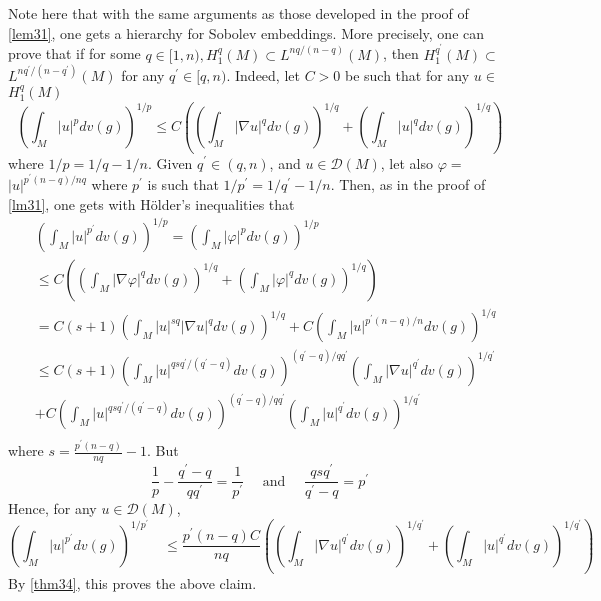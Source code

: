 \documentclass[12pt,hyperref,a4paper,UTF8]{ctexart}
\begin{document}
\vskip 3pt
Note here that with the same arguments as those developed in the proof of \autoref{lem31}, one gets a hierarchy for Sobolev embeddings. More precisely, one can prove that if for some $q \in[1, n), H_1^q(M) \subset L^{n q /(n-q)}(M)$, then $H_1^{q^{\prime}}(M) \subset$ $L^{n q^{\prime} /\left(n-q^{\prime}\right)}(M)$ for any $q^{\prime} \in[q, n)$. Indeed, let $C>0$ be such that for any $u \in$ $H_1^q(M)$
$$
\left(\int_M|u|^p d v(g)\right)^{1 / p} \leq C\left(\left(\int_M|\nabla u|^q d v(g)\right)^{1 / q}+\left(\int_M|u|^q d v(g)\right)^{1 / q}\right)
$$
where $1 / p=1 / q-1 / n$. Given $q^{\prime} \in(q, n)$, and $u \in \mathcal{D}(M)$, let also $\varphi=$ $|u|^{p^{\prime}(n-q) / n q}$ where $p^{\prime}$ is such that $1 / p^{\prime}=1 / q^{\prime}-1 / n$. Then, as in the proof of \autoref{lm31}, one gets with Hölder's inequalities that
$$
\begin{aligned}
    &\left(\int_M|u|^{p^{\prime}} d v(g)\right)^{1 / p} =\left(\int_M|\varphi|^p d v(g)\right)^{1 / p} \\
    &\leq C\left(\left(\int_M|\nabla \varphi|^q d v(g)\right)^{1 / q}+\left(\int_M|\varphi|^q d v(g)\right)^{1 / q}\right) \\
    &=C(s+1)\left(\int_M|u|^{s q}|\nabla u|^q d v(g)\right)^{1 / q}+C\left(\int_M|u|^{p^{\prime}(n-q) / n} d v(g)\right)^{1 / q} \\
    & \leq C(s+1)\left(\int_M|u|^{q s q^{\prime} /\left(q^{\prime}-q\right)} d v(g)\right)^{\left(q^{\prime}-q\right) / q q^{\prime}}\left(\int_M|\nabla u|^{q^{\prime}} d v(g)\right)^{1 / q^{\prime}} \\
    &+C\left(\int_M|u|^{q s q^{\prime} /\left(q^{\prime}-q\right)} d v(g)\right)^{\left(q^{\prime}-q\right) / q q^{\prime}}\left(\int_M|u|^{q^{\prime}} d v(g)\right)^{1 / q^{\prime}}\\
\end{aligned}
$$
where $s=\frac{p^{\prime}(n-q)}{n q}-1$. But
$$
\frac{1}{p}-\frac{q^{\prime}-q}{q q^{\prime}}=\frac{1}{p^{\prime}} \quad \text { and } \quad \frac{q s q^{\prime}}{q^{\prime}-q}=p^{\prime}
$$
Hence, for any $u \in \mathcal{D}(M)$,
$$
\left(\int_M|u|^{p^{\prime}} d v(g)\right)^{1 / p^{\prime}} 
\quad \leq \frac{p^{\prime}(n-q) C}{n q}\left(\left(\int_M|\nabla u|^{q^{\prime}} d v(g)\right)^{1 / q^{\prime}}+\left(\int_M|u|^{q^{\prime}} d v(g)\right)^{1 / q^{\prime}}\right)
$$
By \autoref{thm34}, this proves the above claim.
\end{document}
